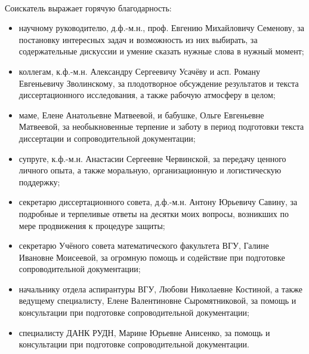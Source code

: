 

~~


Соискатель выражает горячую благодарность:
\begin{itemize}
	\item
		научному руководителю, д.ф.-м.н., проф. Евгению Михайловичу Семенову,
		за
		постановку интересных задач и возможность из них выбирать,
		за
		содержательные дискуссии
		и умение сказать нужные слова в нужный момент;
	\item
		коллегам, к.ф.-м.н. Александру Сергеевичу Усачёву и асп. Роману Евгеньевичу Зволинскому,
		за
		плодотворное обсуждение результатов и текста диссертационного исследования,
		а также рабочую атмосферу в целом;
	\item
		маме, Елене Анатольевне Матвеевой,
		и бабушке, Ольге Евгеньевне Матвеевой,
		за необыкновенные терпение и заботу
		в период подготовки текста диссертации и сопроводительной документации;
	\item
		супруге, к.ф.-м.н. Анастасии Сергеевне Червинской,
		за
		передачу ценного личного опыта,
		а также моральную, организационную и логистическую поддержку;
	\item
		секретарю диссертационного совета, д.ф.-м.н. Антону Юрьевичу Савину,
		за подробные и терпеливые ответы на десятки моих вопросы, возникших по мере продвижения к процедуре защиты;
	\item
		секретарю Учёного совета математического факультета ВГУ, Галине Ивановне Моисеевой,
		за
		огромную помощь и содействие при подготовке сопроводительной документации;
	\item
		начальнику отдела аспирантуры ВГУ, Любови Николаевне Костиной, а также ведущему специалисту, Елене Валентиновне Сыромятниковой,
		за
		помощь и консультации при подготовке сопроводительной документации;
	\item
		специалисту ДАНК РУДН, Марине Юрьевне Анисенко,
		за
		помощь и консультации при подготовке сопроводительной документации.
\end{itemize}
